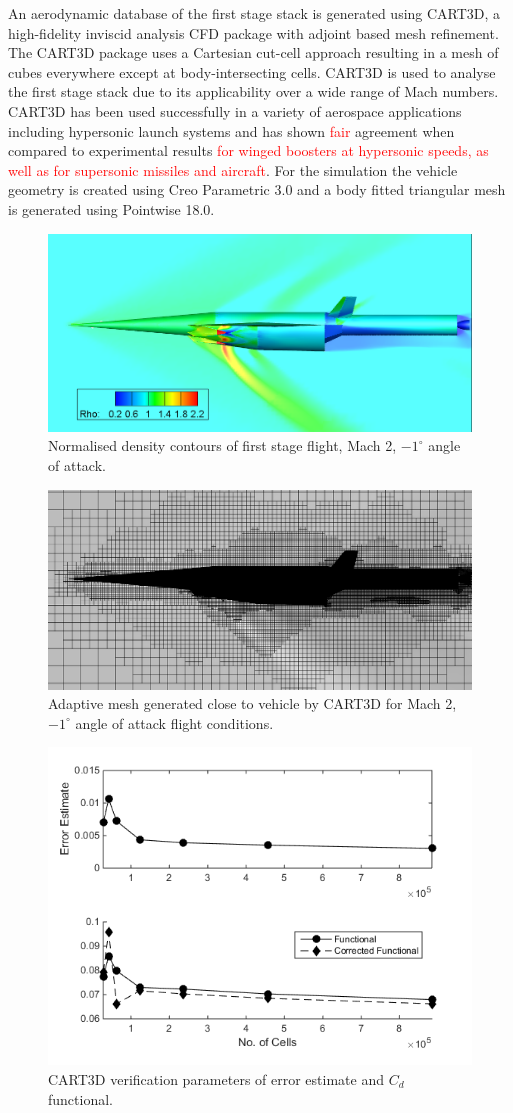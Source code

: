 \documentclass[journal]{new-aiaa}
\begin{document}
An aerodynamic database of the first stage stack is generated using CART3D\cite{CART3D}, a high-fidelity inviscid analysis CFD package with adjoint based mesh refinement. The CART3D package uses a Cartesian cut-cell approach\cite{Aftosmis1998} resulting in a mesh of cubes everywhere except at body-intersecting cells. CART3D is used to analyse the first stage stack due to its applicability over a wide range of Mach numbers. CART3D has been used successfully in a variety of aerospace applications including hypersonic launch systems\cite{Mehta2015} and has shown \textcolor{red}{fair} agreement when compared to experimental results \textcolor{red}{for winged boosters at hypersonic speeds\cite{Sagerman2017}, as well as for supersonic missiles\cite{Abeynayake} and aircraft\cite{Aftosmis2011}}.
For the simulation the vehicle geometry is created using Creo Parametric 3.0\cite{CREO} and a body fitted triangular mesh is generated using Pointwise 18.0\cite{Pointwise}.
\begin{figure}[ht]
	\centering
	\includegraphics[width=0.6\linewidth]{CARTcontour}
	\caption{Normalised density contours of first stage flight, Mach 2, $-1^\circ$ angle of attack.}
	\label{fig:CARTcontour}
\end{figure}
\begin{figure}[ht]
	\centering
	\includegraphics[width=0.6\linewidth]{CARTmesh}
	\caption{Adaptive mesh generated close to vehicle by CART3D for Mach 2, $-1^\circ$ angle of attack flight conditions.}
	\label{fig:CARTmesh}
\end{figure}
\begin{figure}[ht]
	\centering
	\includegraphics[width=0.4\linewidth]{CART}
	\caption{CART3D verification parameters of error estimate and $C_d$ functional.}
	\label{fig:CART}
\end{figure}
\end{document}
